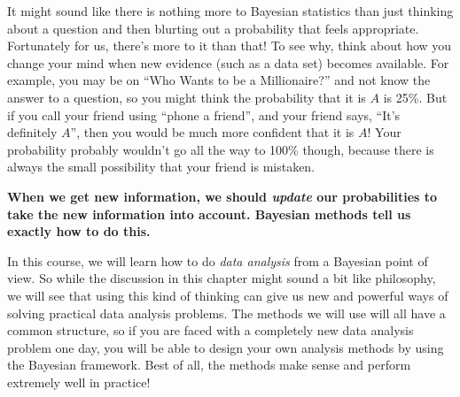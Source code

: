 It might sound like there is nothing more to Bayesian statistics than just
thinking about a question and then blurting out a probability that feels
appropriate. Fortunately for us, there's more to it than that! To see why, think
about how you change your mind when new evidence (such as a data set) becomes
available. For example, you may be on ``Who Wants to be a Millionaire?'' and
not know the answer to a question, so you might think the probability that it is
$A$ is 25\%. But if you call your friend using ``phone a friend'', and
your friend says,
``It's definitely $A$'', then you would be much more confident that it is $A$!
Your probability probably wouldn't go all the way to 100\% though, because there
is always the small possibility that your friend is mistaken.\\

\begin{framed}
{\bf When we get new information, we should {\it update} our probabilities to
take the new information into account. Bayesian methods tell us exactly how to
do this.}
\end{framed}

In this course, we will learn how to do {\it data analysis} from a Bayesian
point of view. So while the discussion in this chapter might sound a bit
like philosophy, we will see that using this kind of thinking can give us
new and powerful ways of solving practical data analysis problems. The methods we will use
will all have a common structure, so if you are faced with a completely new
data analysis problem one day, you will be able to design your own analysis
methods by using the Bayesian framework. Best of all, the methods make sense
and perform extremely well in practice!

